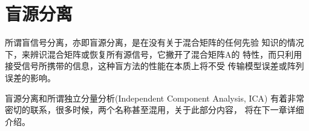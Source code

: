 \section{盲源分离}
所谓盲信号分离，亦即盲源分离，是在没有关于混合矩阵的任何先验
知识的情况下，来辨识混合矩阵或恢复所有源信号，它撇开了混合矩阵A的
特性，而只利用接受信号所携带的信息，这种盲方法的性能在本质上将不受
传输模型误差或阵列误差的影响。

盲源分离和所谓独立分量分析(Independent Component Analysis, ICA)
有着非常密切的联系，很多时候，两个名称甚至混用，关于此部分内容，
将在下一章详细介绍。


